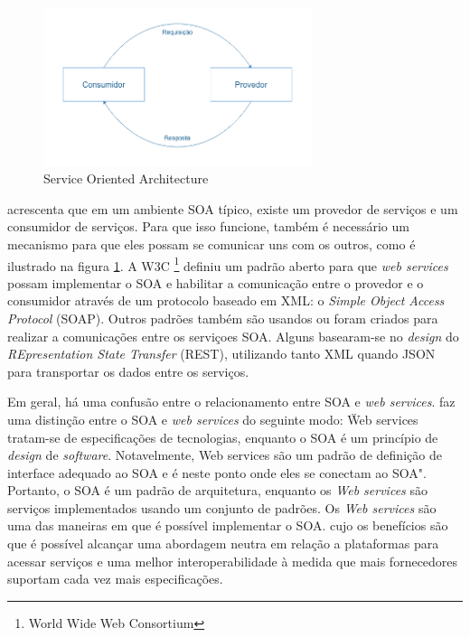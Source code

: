 \begin{figure}[htbp]
    \centering
    \includegraphics[width=0.7\textwidth]{figuras/soa.png}
    \caption{Service Oriented Architecture}
    \label{fig:soa}
\end{figure}

 acrescenta que em um ambiente SOA típico, existe um provedor de serviços e um consumidor de serviços. Para que isso funcione, também é necessário um mecanismo para que eles possam se comunicar uns com os outros, como é ilustrado na figura \ref{fig:soa}. A W3C \footnote{World Wide Web Consortium} definiu um padrão aberto para que \textit{web services} possam implementar o SOA e habilitar a comunicação entre o provedor e o consumidor através de um protocolo baseado em XML: o \textit{Simple Object Access Protocol} (SOAP). Outros padrões também são usandos ou foram criados para realizar a comunicações entre os serviçoes SOA. Alguns basearam-se no \textit{design} do \textit{REpresentation State Transfer} (REST), utilizando tanto XML quando JSON para transportar os dados entre os serviços.

Em geral, há uma confusão entre o relacionamento entre SOA e \textit{web services}.  faz uma distinção entre o SOA e \textit{web services} do seguinte modo: \"Web services tratam-se de especificações de tecnologias, enquanto o SOA é um princípio de \textit{design} de \textit{software}. Notavelmente, Web services são um padrão de definição de interface adequado ao SOA e é neste ponto onde eles se conectam ao SOA". Portanto, o SOA é um padrão de arquitetura, enquanto os \textit{Web services} são serviços implementados usando um conjunto de padrões. Os \textit{Web services} são uma das maneiras em que é possível implementar o SOA. cujo os benefícios são que é possível alcançar uma abordagem neutra em relação a plataformas para acessar serviços e uma melhor interoperabilidade à medida que mais fornecedores suportam cada vez mais especificações.
